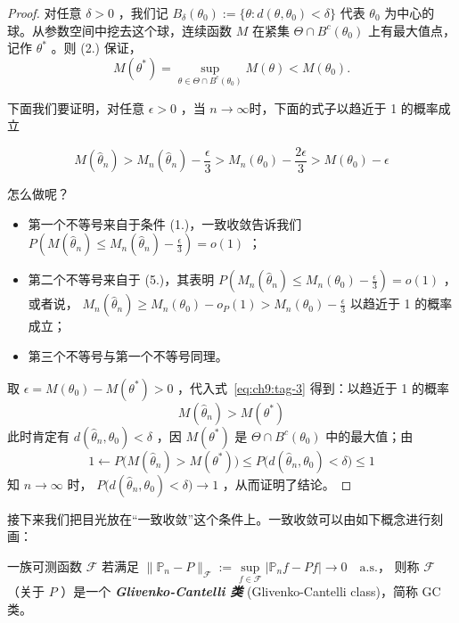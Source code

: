\begin{proof}

对任意 $\delta>0$ ，我们记 $B_\delta(\theta_0):=\{\theta:d(\theta,\theta_0)<\delta\}$ 代表 $\theta_0$ 为中心的球。从参数空间中挖去这个球，连续函数 $M$ 在紧集 $\Theta\cap B^c(\theta_0)$ 上有最大值点，记作 $\theta^*$ 。则 (2.) 保证，
$$M(\theta^*)=\sup\limits_{\theta\in\Theta\cap B^c(\theta_0)}M(\theta)<M(\theta_0).$$

下面我们要证明，对任意 $\epsilon>0$ ，当 $n\to\infty$时，下面的式子以趋近于 1 的概率成立

\begin{equation}
\label{eq:ch9:tag-3}
M(\widehat\theta_n)>M_n(\widehat\theta_n)-\frac\epsilon3>M_n(\theta_0)-\frac{2\epsilon}3>M(\theta_0)-\epsilon
\end{equation}

怎么做呢？

\begin{itemize}
\tightlist
\item
  第一个不等号来自于条件 (1.)，一致收敛告诉我们 $P\left(M(\widehat\theta_n)\le M_n(\widehat\theta_n)-\tfrac\epsilon3\right)=o(1)$ ；
\item
  第二个不等号来自于 (5.)，其表明 $P\left(M_n(\widehat\theta_n)\le M_n(\theta_0)-\tfrac\epsilon3\right)=o(1)$ ，或者说， $M_n(\widehat\theta_n)\ge M_n(\theta_0)-o_P(1)>M_n(\theta_0)-\tfrac\epsilon3$ 以趋近于 1 的概率成立；
\item
  第三个不等号与第一个不等号同理。
\end{itemize}

取 $\epsilon=M(\theta_0)-M(\theta^*)>0$ ，代入式~\eqref{eq:ch9:tag-3} 得到：以趋近于 1 的概率\[M(\widehat\theta_n)>M(\theta^*)\]
此时肯定有 $d(\widehat\theta_n,\theta_0)<\delta$ ，因 $M(\theta^*)$ 是 $\Theta\cap B^c(\theta_0)$ 中的最大值；由 \[ 1\leftarrow P\big(M(\widehat\theta_n)>M(\theta^*)\big)\le P\big(d(\widehat\theta_n,\theta_0)<\delta\big)\le 1 \]知 $n\to\infty$ 时， $P\big(d(\widehat\theta_n,\theta_0)<\delta\big)\to 1$ ，从而证明了结论。

\end{proof}

接下来我们把目光放在``一致收敛''这个条件上。一致收敛可以由如下概念进行刻画：

\begin{definition*}
一族可测函数 $\mathscr F$ 若满足 $\|\mathbb P_n-P\|_{\mathscr F}:=\sup\limits_{f\in\mathscr F}|\mathbb P_nf-Pf|\to 0\quad \text{a.s.}$，
则称 $\mathscr F$ （关于 $P$ ）是一个 \textbf{\emph{Glivenko-Cantelli 类}} (Glivenko-Cantelli class)，简称 GC 类。
\end{definition*}

